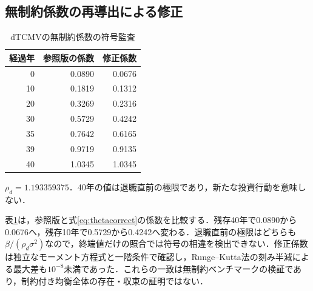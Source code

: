 \documentclass[11pt,a4paper]{article}
\numberwithin{equation}{section}
\numberwithin{table}{section}
\numberwithin{figure}{section}
\theoremstyle{plain}
\theoremstyle{definition}
\begin{document}
\subsection{無制約係数の再導出による修正}
\begin{table}[htbp]\centering\small
\caption{dTCMVの無制約係数の符号監査}\label{tab:theta}
\begin{tabular}{rrr}
\toprule
経過年 & 参照版の係数 & 修正係数 \\ \midrule
0 & 0.0890 & 0.0676 \\
10 & 0.1819 & 0.1312 \\
20 & 0.3269 & 0.2316 \\
30 & 0.5729 & 0.4242 \\
35 & 0.7642 & 0.6165 \\
39 & 0.9719 & 0.9135 \\
40 & 1.0345 & 1.0345 \\
\bottomrule\end{tabular}
\par\vspace{3pt}\begin{minipage}{0.97\textwidth}\footnotesize $\rho_d=1.193359375$．40年の値は退職直前の極限であり，新たな投資行動を意味しない．\end{minipage}
\end{table}
表\ref{tab:theta}は，参照版と式\eqref{eq:thetacorrect}の係数を比較する．残存40年で0.0890から0.0676へ，残存10年で0.5729から0.4242へ変わる．退職直前の極限はどちらも$\beta/(\rho_d\sigma^2)$なので，終端値だけの照合では符号の相違を検出できない．修正係数は独立なモーメント方程式と一階条件で確認し，Runge--Kutta法の刻み半減による最大差も$10^{-8}$未満であった．これらの一致は無制約ベンチマークの検証であり，制約付き均衡全体の存在・収束の証明ではない．
\end{document}
